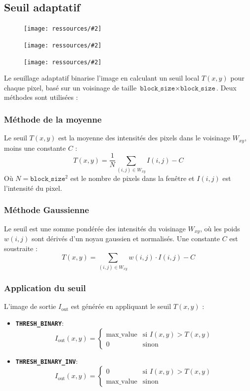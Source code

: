 \documentclass{article}
\newcommand{\stepimage}[3][0.3\textwidth]{%
  \minipage{#1}
    \texttt{[image: ressources/\#2]}
    \caption{#3}
  \endminipage\hfill
}
\begin{document}
\subsection{Seuil adaptatif}
\begin{figure}[!htb]
    \stepimage[0.30\textwidth]{image_1_step_03_threshold.png}{}
    \stepimage[0.30\textwidth]{image_2_step_03_threshold.png}{}
    \stepimage[0.26\textwidth]{image_3_step_03_threshold.png}{}
\end{figure}
Le seuillage adaptatif binarise l'image en calculant un seuil local \(T(x, y)\) pour chaque pixel, basé sur un voisinage de taille \(\texttt{block\_size} \times \texttt{block\_size}\). Deux méthodes sont utilisées :

\subsubsection{Méthode de la moyenne}
Le seuil \(T(x, y)\) est la moyenne des intensités des pixels dans le voisinage \(W_{xy}\), moins une constante \(C\) :
\[
T(x, y) = \frac{1}{N} \sum_{(i, j) \in W_{xy}} I(i, j) - C
\]
Où \(N = \texttt{block\_size}^2\) est le nombre de pixels dans la fenêtre et \(I(i, j)\) est l'intensité du pixel.

\subsubsection{Méthode Gaussienne}
Le seuil est une somme pondérée des intensités du voisinage \(W_{xy}\), où les poids \(w(i, j)\) sont dérivés d'un noyau gaussien et normalisés. Une constante \(C\) est soustraite :
\[
T(x, y) = \sum_{(i, j) \in W_{xy}} w(i, j) \cdot I(i, j) - C
\]

\subsubsection{Application du seuil}
L'image de sortie \(I_{\text{out}}\) est générée en appliquant le seuil \(T(x, y)\) :
\begin{itemize}
    \item \textbf{\texttt{THRESH\_BINARY}}:
    \[
    I_{\text{out}}(x, y) =
    \begin{cases}
    \text{max\_value} & \text{si } I(x, y) > T(x, y) \\
    0 & \text{sinon}
    \end{cases}
    \]
    \item \textbf{\texttt{THRESH\_BINARY\_INV}}:
    \[
    I_{\text{out}}(x, y) =
    \begin{cases}
    0 & \text{si } I(x, y) > T(x, y) \\
    \text{max\_value} & \text{sinon}
    \end{cases}
    \]
\end{itemize}
\end{document}
